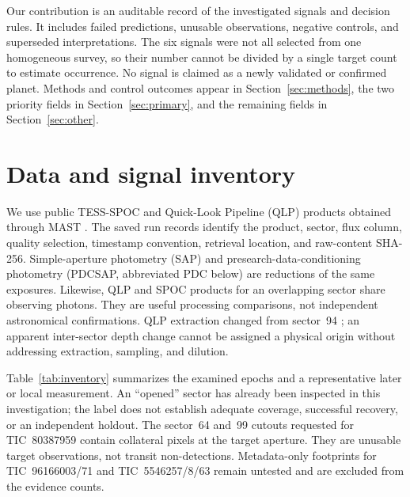 \documentclass[11pt]{article}
\begin{document}
Our contribution is an auditable record of the investigated signals and decision rules. It includes failed predictions, unusable observations, negative controls, and superseded interpretations. The six signals were not all selected from one homogeneous survey, so their number cannot be divided by a single target count to estimate occurrence. No signal is claimed as a newly validated or confirmed planet. Methods and control outcomes appear in Section~\ref{sec:methods}, the two priority fields in Section~\ref{sec:primary}, and the remaining fields in Section~\ref{sec:other}.

\section{Data and signal inventory}\label{sec:data}
We use public TESS-SPOC and Quick-Look Pipeline (QLP) products obtained through MAST \citep{caldwell2020,huang2020}. The saved run records identify the product, sector, flux column, quality selection, timestamp convention, retrieval location, and raw-content SHA-256. Simple-aperture photometry (SAP) and presearch-data-conditioning photometry (PDCSAP, abbreviated PDC below) are reductions of the same exposures. Likewise, QLP and SPOC products for an overlapping sector share observing photons. They are useful processing comparisons, not independent astronomical confirmations. QLP extraction changed from sector~94 \citep{petitpas2026}; an apparent inter-sector depth change cannot be assigned a physical origin without addressing extraction, sampling, and dilution.

Table~\ref{tab:inventory} summarizes the examined epochs and a representative later or local measurement. An ``opened'' sector has already been inspected in this investigation; the label does not establish adequate coverage, successful recovery, or an independent holdout. The sector~64 and~99 cutouts requested for TIC~80387959 contain collateral pixels at the target aperture. They are unusable target observations, not transit non-detections. Metadata-only footprints for TIC~96166003/71 and TIC~5546257/8/63 remain untested and are excluded from the evidence counts.
\end{document}
